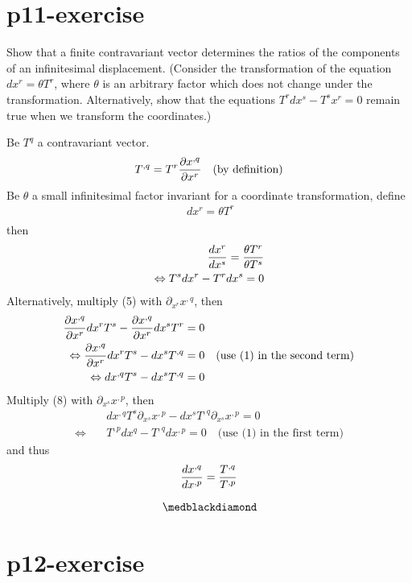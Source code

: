 \section{p11-exercise}

\begin{tcolorbox}
Show that a finite contravariant vector determines the ratios of the components of an infinitesimal displacement. (Consider the transformation of the equation $dx^r=\theta T^r$, where $\theta$ is an arbitrary factor which does not change under the transformation. Alternatively, show that the equations $T^{r} dx^{s}-T^{s} x^{r} = 0$ remain true when we transform the coordinates.)

\end{tcolorbox}
Be $T^{q}$ a contravariant vector.
\begin{align}
T^{,q}=T^{r} \pdv{x^{,q}}{x^r}\quad\text{(by definition)}
\end{align}
Be  $\theta$ a small infinitesimal factor invariant for a coordinate transformation,  define \\
\begin{align}
\ dx^{r} = \theta T^{r} \\
\end{align}
then
\begin{align}
\dv{x^r}{x^s} = \frac{\theta T^r}{\theta T^s}\\
\Leftrightarrow T^s dx^r - T^r dx^s = 0
\end{align}
Alternatively, multiply (5) with $\partial_{x^r}{x^{,q}}$, then
\begin{align}
\pdv{x^{,q}}{x^r} dx^r T^s   -  \pdv{x^{,q}}{x^r}dx^s T^r &= 0\\
\Leftrightarrow \pdv{x^{,q}}{x^r} dx^r T^s   -  dx^s T^{,q} &= 0 \quad \text{(use (1) in the second term)}\\
\Leftrightarrow dx^{,q} T^s   -  dx^s T^{,q} &= 0 \\
\end{align}
Multiply (8) with $\partial_{x^s}{x^{,p}}$, then
\begin{align}
\ &dx^{,q} T^s \partial_{x^s}{x^{,p}}  -  dx^s T^{,q}\partial_{x^s}{x^{,p}} = 0 \\
\Leftrightarrow \quad &T^{,p} dx^q   -   T^{,q} dx^{,p} = 0 \quad \text{(use (1) in the first term)}
\end{align}
and thus 
$$\dv{x^{,q}}{x^{,p}} = \frac{T^{,q}}{T^{,p}}$$

$$\medblackdiamond$$
\pagebreak[4]


\section{p12-exercise}

